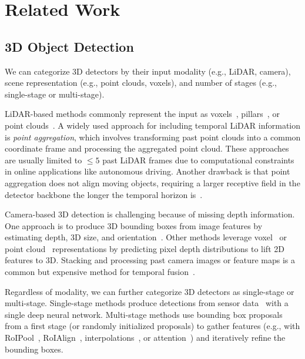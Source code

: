 \chapter{Related Work}
\label{sec:related}

\section{3D Object Detection}

We can categorize 3D detectors by their input modality (e.g., LiDAR, camera), scene representation (e.g., point clouds, voxels), and number of stages (e.g., single-stage or multi-stage).

LiDAR-based methods commonly represent the input as
voxels~\cite{yan2018second,hednet,safdnet,li20173d,engelcke2017vote3deep,song2016deep}, pillars~\cite{ku2018joint,lang2019pointpillars,simony2018complex,wang2015voting,wang2020pillar,yang2018pixor},
or point clouds~\cite{ngiam2019starnet,wu2024point,shi2019pointrcnn,shi2020point,yang20203dssd}.
A widely used approach for including temporal LiDAR information is \textit{point aggregation}, which involves
transforming past point clouds into a common coordinate frame and processing the aggregated point cloud.
These approaches are usually limited to $\le 5$ past LiDAR frames due to computational constraints~\cite{li2023modar} in online applications like autonomous driving.
Another drawback is that point aggregation does not align moving objects, requiring a larger receptive field in the detector backbone the longer the temporal horizon is~\cite{safdnet,li2023modar}.

Camera-based 3D detection is challenging because of missing depth information.
One approach is to produce 3D bounding boxes from image features
by estimating depth, 3D size, and orientation~\cite{wang2021fcos3d,xu2018multi,chen20153d,mousavian20173d}.
Other methods leverage voxel~\cite{roddick2018orthographic,reading2021categorical,qian2020end} or point cloud~\cite{wang2019pseudo,you2019pseudo} representations
by predicting pixel depth distributions to lift 2D features to 3D.
Stacking and processing past camera images or feature maps
is a common but expensive method for temporal fusion~\cite{zeng2022lift,piergiovanni20214d,hu2021fiery,saha2022translating,can2022understanding}.

Regardless of modality, we can further categorize 3D detectors as single-stage or multi-stage. Single-stage methods produce detections from sensor data~\cite{safdnet,hednet,yan2018second,engelcke2017vote3deep,wang2021fcos3d,chang2024bevmap} with a single deep neural network.
Multi-stage methods use bounding box proposals from a first stage (or randomly initialized proposals)
to gather features (e.g., with RoIPool~\cite{ren2015faster}, RoIAlign~\cite{he2017mask},
interpolations~\cite{centerpoint}, or attention~\cite{zhou2022centerformer,casas2024detra,li2023dfa3d,lin2022sparse4d,wang2022detr3d,liu2022petr,liu2023petrv2})
and iteratively refine the bounding boxes.

